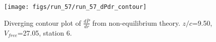 \begin{figure}[H]
\centering
\texttt{[image: figs/run\_57/run\_57\_dPdr\_contour]}
\caption{Diverging contour plot of $\frac{d\bar{P}}{dr}$ from non-equilibrium theory. $z/c$=9.50, $V_{free}$=27.05, station 6.}
\label{fig:run_57_dPdr_contour}
\end{figure}


